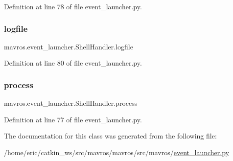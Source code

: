 Definition at line 78 of file event\+\_\+launcher.\+py.

\mbox{\label{classmavros_1_1event__launcher_1_1ShellHandler_ae55a715a3e3afb61c6e9fca7350a39f5}} 
\subsubsection{\texorpdfstring{logfile}{logfile}}
{\footnotesize\ttfamily mavros.\+event\+\_\+launcher.\+Shell\+Handler.\+logfile}



Definition at line 80 of file event\+\_\+launcher.\+py.

\mbox{\label{classmavros_1_1event__launcher_1_1ShellHandler_a8f9556714b12b53ef0027ffe6b0afad2}} 
\subsubsection{\texorpdfstring{process}{process}}
{\footnotesize\ttfamily mavros.\+event\+\_\+launcher.\+Shell\+Handler.\+process}



Definition at line 77 of file event\+\_\+launcher.\+py.



The documentation for this class was generated from the following file\+:\begin{DoxyCompactItemize}
\item 
/home/eric/catkin\+\_\+ws/src/mavros/mavros/src/mavros/\mbox{\hyperlink{event__launcher_8py}{event\+\_\+launcher.\+py}}\end{DoxyCompactItemize}
